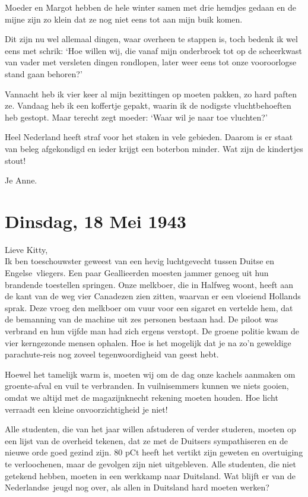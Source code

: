 \documentclass{book}
\begin{document}
Moeder en Margot hebben de hele winter samen met drie hemdjes gedaan en de mijne
zijn zo klein dat ze nog niet eens tot aan mijn buik komen.

Dit zijn nu wel allemaal dingen, waar overheen te stappen is, toch bedenk ik wel
eens met schrik: `Hoe willen wij, die vanaf mijn onderbroek tot op de
scheerkwast van vader met versleten dingen rondlopen, later weer eens tot onze
vooroorlogse stand gaan behoren?'

Vannacht heb ik vier keer al mijn bezittingen op moeten pakken, zo hard paften
ze. Vandaag heb ik een koffertje gepakt, waarin ik de nodigste vluchtbehoeften
heb gestopt. Maar terecht zegt moeder: `Waar wil je naar toe vluchten?'

Heel Nederland heeft straf voor het staken in vele gebieden. Daarom is er staat
van beleg afgekondigd en ieder krijgt een boterbon minder. Wat zijn de
kindertjes stout!

Je Anne.

\section*{Dinsdag, 18 Mei 1943}

Lieve Kitty,\\
Ik ben toeschouwster geweest van een hevig luchtgevecht tussen
Duitse en Engelse~vliegers. Een paar Geallieerden moesten jammer genoeg uit hun
brandende toestellen springen. Onze melkboer, die in Halfweg woont, heeft aan de
kant van de weg vier Canadezen zien zitten, waarvan er een vloeiend Hollands
sprak. Deze vroeg den melkboer om vuur voor een sigaret en vertelde hem, dat de
bemanning van de machine uit zes personen bestaan had. De piloot was verbrand en
hun vijfde man had zich ergens verstopt. De groene politie kwam de vier
kerngezonde mensen ophalen. Hoe is het mogelijk dat je na zo'n geweldige
parachute-reis nog zoveel tegenwoordigheid van geest hebt.

Hoewel het tamelijk warm is, moeten wij om de dag onze kachels aanmaken om
groente-afval en vuil te verbranden. In vuilnisemmers kunnen we niets gooien,
omdat we altijd met de magazijnknecht rekening moeten houden.  Hoe licht
verraadt een kleine onvoorzichtigheid je niet!

Alle studenten, die van het jaar willen afstuderen of verder studeren, moeten op
een lijst van de overheid tekenen, dat ze met de Duitsers sympathiseren en de
nieuwe orde goed gezind zijn. 80 pCt heeft het vertikt zijn geweten en
overtuiging te verloochenen, maar de gevolgen zijn niet uitgebleven. Alle
studenten, die niet getekend hebben, moeten in een werkkamp naar Duitsland. Wat
blijft er van de Nederlandse~jeugd nog over, als allen in Duitsland hard moeten
werken?
\end{document}
